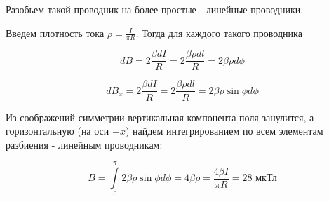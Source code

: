 \documentclass[a4paper,14pt]{extarticle}
\begin{document}
\begin{figure}[H]
\end{figure}
Разобьем такой проводник на более простые - линейные проводники. 

Введем плотность тока $\rho=\frac{I}{\pi R}$. Тогда для каждого такого проводника

\begin{equation}
    dB=2\frac{\beta dI}{R}=2\frac{\beta \rho dl}{R}=2\beta \rho d\phi
\end{equation}

\begin{equation}
    dB_x=2\frac{\beta dI}{R}=2\frac{\beta \rho dl}{R}=2\beta \rho  \sin \phi d\phi
\end{equation}

Из соображений симметрии вертикальная компонента поля занулится, а горизонтальную (на оси $+x$) найдем интегрированием по всем элементам разбиения - линейным проводникам:

\begin{equation}
    B=\int\limits_0^{\pi}2\beta \rho \sin \phi d\phi= 4\beta \rho=\frac{4\beta I}{\pi R}=28\text{ мкТл}
\end{equation}
\end{document}
